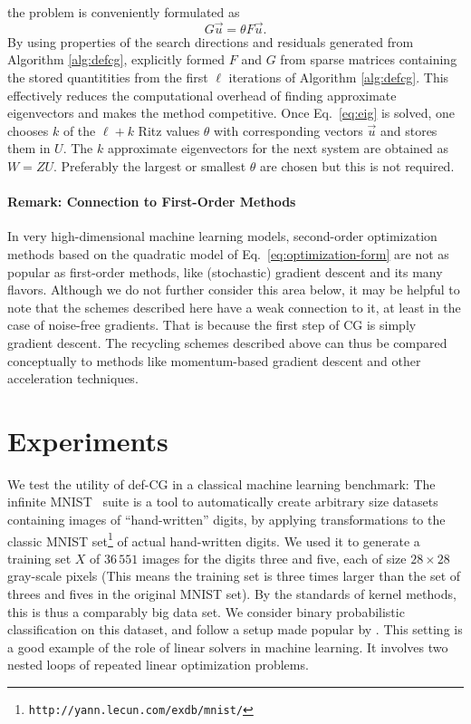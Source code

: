 \documentclass{article}
\begin{document}
the problem is conveniently formulated as 
\begin{equation}
G\vec{u}=\theta F\vec{u}.
\label{eq:eig}
\end{equation}
By using properties of the search directions and residuals generated from Algorithm \ref{alg:defcg}, \citet{saad00} explicitly formed $F$ and $G$ from sparse matrices containing the stored quantitities from the first $\ell$ iterations of Algorithm \ref{alg:defcg}. This effectively reduces the computational overhead of finding approximate eigenvectors and makes the method competitive. Once Eq.~\eqref{eq:eig} is solved, one chooses $k$ of the $\ell+k$ Ritz values $\theta$ with corresponding vectors $\vec{u}$ and stores them in $U$. The $k$ approximate eigenvectors for the next system are obtained as $W=ZU$. Preferably the largest or smallest $\theta$ are chosen but this is not required.   

\paragraph{Remark: Connection to First-Order Methods}
\label{sub:connection_to_first_order_methods}

In very high-dimensional machine learning models, second-order optimization methods based on the quadratic model of Eq.~\eqref{eq:optimization-form} are not as popular as first-order methods, like (stochastic) gradient descent and its many flavors. Although we do not further consider this area below, it may be helpful to note that the schemes described here have a weak connection to it, at least in the case of noise-free gradients. That is because the first step of CG is simply gradient descent. The recycling schemes described above can thus be compared conceptually to methods like momentum-based gradient descent \cite{polyak1964some} and other acceleration techniques.

\section{Experiments}
\label{sec:experiments}

We test the utility of def-CG in a classical machine learning benchmark: The infinite MNIST~\cite{loosli06} suite is a tool to automatically create arbitrary size datasets containing images of ``hand-written'' digits, by applying transformations to the classic MNIST set\footnote{\texttt{http://yann.lecun.com/exdb/mnist/}} of actual hand-written digits. We used it to generate a training set $X$ of $36\,551$ images for the digits three and five, each of size $28\times 28$ gray-scale pixels (This means the training set is three times larger than the set of threes and fives in the original MNIST set). By the standards of kernel methods, this is thus a comparably big data set. We consider binary probabilistic classification on this dataset, and follow a setup made popular by \citet{kuss06}. This setting is a good example of the role of linear solvers in machine learning. It involves two nested loops of repeated linear optimization problems. %
\end{document}

